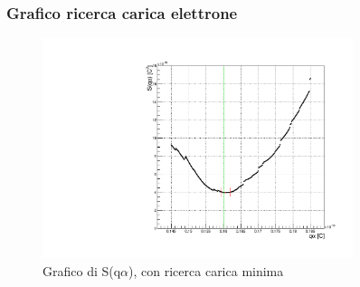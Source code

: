 \subsubsection{Grafico ricerca carica elettrone}
\begin{figure}[H]
    \centering
    \includegraphics[width=0.81\textwidth]{graph1.pdf}
    \caption{Grafico di S(q$\alpha$), con ricerca carica minima}
\end{figure}